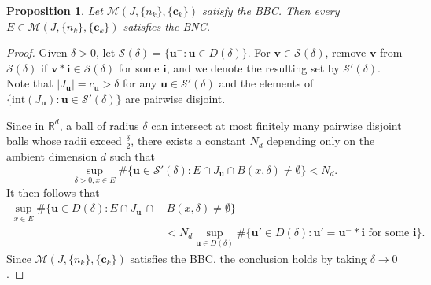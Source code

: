 \documentclass[12pt]{amsart}
\numberwithin{equation}{section}
\theoremstyle{plain}
\newtheorem{proposition}[theorem]{Proposition}
\theoremstyle{remark}
\theoremstyle{definition}
\newcommand{\iii}{\mathbf{i}}
\newcommand{\bu}{\mathbf{u}}
\newcommand{\bv}{\mathbf{v}}
\newcommand{\ccc}{\mathbf{c}}
\newcommand{\de}{\delta}
\begin{document}
	\begin{proposition}\label{BC->BNC}
		Let $\mathcal{M}(J,\{n_k\},\{\ccc_k\})$ satisfy the BBC. Then every $E\in\mathcal{M}(J,\{n_k\},\{\ccc_k\})$ satisfies the BNC.
	\end{proposition}
	\begin{proof}
		Given  $\de>0$, let	$\mathcal{S}(\de)=\big\{\bu^-:\bu\in D(\de)\big\}$. For $\bv\in \mathcal{S}(\de)$,  remove $\bv$ from $\mathcal{S}(\de)$ if  $\bv*\iii\in \mathcal{S}(\de)$ for some $\iii$, and we denote the resulting set by $\mathcal{S}'(\de)$. Note that $|J_\bu|=c_\bu>\de$ for any $\bu\in \mathcal{S}'(\de)$ and the elements of $\{\mbox{int}(J_\bu):\bu\in \mathcal{S}'(\de)\}$ are pairwise disjoint. 
		
		
		Since in $\mathbb{R}^d$, a ball of radius $\de$ can intersect at most finitely many pairwise disjoint balls whose radii exceed $\frac\de2$, there exists a constant $N_d$ depending only on the ambient dimension $d$ such that
		\begin{equation*}
			\sup_{\de>0,x\in E} \#\big\{\bu\in \mathcal{S}'(\de): E\cap J_\bu\cap B(x,\de)\neq \emptyset \big\}<N_d.
		\end{equation*}
		It then follows that
		\begin{align*}
			\sup_{x\in E} \#\big\{\bu\in D(\de):E\cap J_\bu\,\cap &\,B(x,\de)\neq \emptyset \big\}\\
			&< N_d\sup_{\bu\in D(\de)}\#\big\{\bu'\in D(\de):\bu'=\bu^-*\iii\text {\ for some }\iii\big\}.
		\end{align*}
		Since  $\mathcal{M}(J,\{n_k\},\{\ccc_k\})$ satisfies the BBC,  the conclusion holds by taking $\de\to 0$.
	\end{proof}
\end{document}
